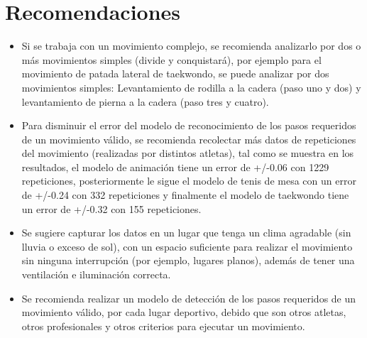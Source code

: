 \section{Recomendaciones} \label{ded:rec}
\begin{itemize}
\item Si se trabaja con un movimiento complejo, se recomienda analizarlo por dos o m\'as movimientos simples (divide y conquistar\'a), por ejemplo para el movimiento de patada lateral de taekwondo, se puede analizar por dos movimientos simples: Levantamiento de rodilla a la cadera (paso uno y dos) y levantamiento de pierna a la cadera (paso tres y cuatro).
\item Para disminuir el error del modelo de reconocimiento de los pasos requeridos de un  movimiento v\'alido, se recomienda recolectar m\'as  datos de  repeticiones del movimiento (realizadas por distintos atletas), tal como se muestra en los resultados, el modelo de animaci\'on tiene un error de +/-0.06  con 1229 repeticiones, posteriormente le sigue el modelo de tenis de mesa con un error de +/-0.24 con 332 repeticiones y finalmente el modelo de taekwondo tiene un error de +/-0.32 con 155 repeticiones.
\item Se sugiere capturar los datos en un  lugar que tenga un clima agradable  (sin lluvia o exceso de sol), con un espacio suficiente para realizar el movimiento sin ninguna interrupci\'on (por ejemplo, lugares planos), adem\'as de tener una  ventilaci\'on e iluminaci\'on correcta.
\item Se recomienda realizar un modelo de detecci\'on de los pasos requeridos de un movimiento v\'alido, por cada lugar deportivo, debido que son otros atletas, otros profesionales y otros  criterios para ejecutar un movimiento.
\end{itemize}